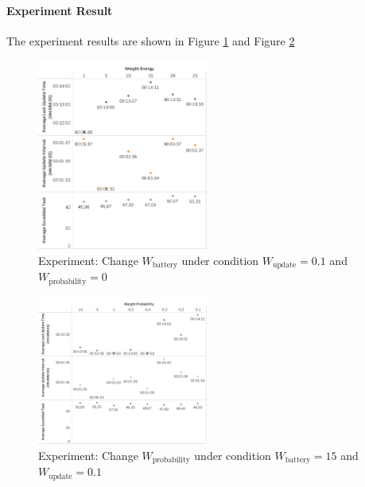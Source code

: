 \paragraph{Experiment Result} The experiment results are shown in Figure \ref{fig:gather_info_experiment_two_value} and Figure \ref{fig:gather_info_experiment_three_value}
\begin{figure}
 \centering
 \includegraphics[width = 0.5\textwidth]{content/images/ch5/gather_info_change_weight_energy_only.png}
 \caption{Experiment: Change $W_{\mbox{battery}}$ under condition $W_{\mbox{update}} = 0.1$ and $W_{\mbox{probability}}=0$}
 \label{fig:gather_info_experiment_two_value}
\end{figure}

\begin{figure}
 \centering
 \includegraphics[width = 0.5\textwidth]{content/images/ch5/gather_info_change_weight_probability_only.png}
 \caption{Experiment: Change $W_{\mbox{probability}}$ under condition $W_{\mbox{battery}}=15$ and $ W_{\mbox{update}}=0.1$}
 \label{fig:gather_info_experiment_three_value}
\end{figure}

